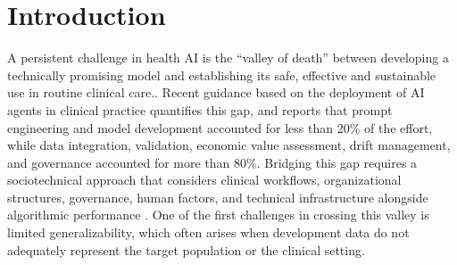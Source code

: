 \documentclass[preprint,5p, 10pt, times]{elsarticle}
\begin{document}
\section*{Introduction}
\label{S:Intro}

A persistent challenge in health AI is the “valley of death” between developing a technically promising model and establishing its safe, effective and sustainable use in routine clinical care.\cite{balch2021bridging,gallifant2025beyond,eapen2026navigating}.
Recent guidance based on the deployment of AI agents in clinical practice quantifies this gap, and reports that prompt engineering and model development accounted for less than 20\% of the effort, while data integration, validation, economic value assessment, drift management, and governance accounted for more than 80\%\cite{gallifant2025beyond}.
Bridging this gap requires a sociotechnical approach that considers clinical workflows, organizational structures, governance, human factors, and technical infrastructure alongside algorithmic performance \cite{salwei2022sociotechnical,sokol2025artificial}.
One of the first challenges in crossing this valley is limited generalizability, which often arises when development data do not adequately represent the target population or the clinical setting. 

\end{document}
